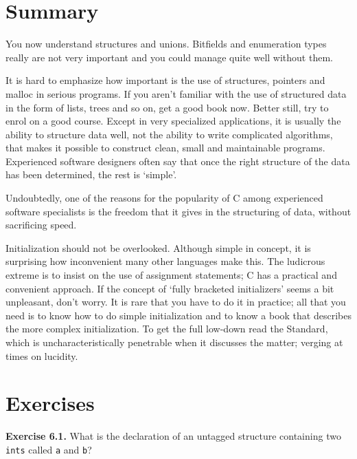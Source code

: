   

 
        \section{Summary}
        


  You now understand structures and unions. Bitfields and enumeration types
   really are not very important and you could manage quite well without
   them.


  It is hard to emphasize how important is the use of structures, pointers
   and malloc in serious programs. If you aren't familiar with the use of
   structured data in the form of lists, trees and so on, get a good book now.
   Better still, try to enrol on a good course. Except in very specialized
   applications, it is usually the ability to structure data well, not the
   ability to write complicated algorithms, that makes it possible to construct
   clean, small and maintainable programs. Experienced software designers often
   say that once the right structure of the data has been determined, the rest
   is `simple'.


  Undoubtedly, one of the reasons for the popularity of C among experienced
   software specialists is the freedom that it gives in the structuring of
   data, without sacrificing speed.


  Initialization should not be overlooked. Although simple in concept, it is
   surprising how inconvenient many other languages make this. The ludicrous
   extreme is to insist on the use of assignment statements; C has a practical
   and convenient approach. If the concept of `fully bracketed
   initializers' seems a bit unpleasant, don't worry. It is rare that you
   have to do it in practice; all that you need is to know how to do simple
   initialization and to know a book that describes the more complex
   initialization. To get the full low-down read the Standard, which is
   uncharacteristically penetrable when it discusses the matter; verging at
   times on lucidity.


 
        \section{Exercises}
        


  \textbf{Exercise 6.1.} What is the declaration of an untagged structure
   containing two \texttt{ints} called \texttt{a} and
   \texttt{b}?


